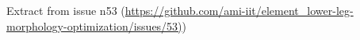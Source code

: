 Extract from issue n53 (\url{https://github.com/ami-iit/element_lower-leg-morphology-optimization/issues/53)})